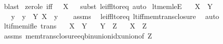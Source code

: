 \begin{isabellebody}
\ blast%
\endisatagproof
{\isafoldproof}%
%
\isadelimproof
\isanewline
%
\endisadelimproof
\isanewline
{}\isamarkupfalse%
\ zero{\isacharunderscore}{\kern0pt}le\ {\isacharbrackleft}{\kern0pt}iff{\isacharbrackright}{\kern0pt}{\isacharcolon}{\kern0pt}\ {\isachardoublequoteopen}{}\ {\isasymle}\ X{\isachardoublequoteclose}%
\isadelimproof
\ %
\endisadelimproof
%
\isatagproof
{}\isamarkupfalse%
\ {\isacharparenleft}{\kern0pt}subst\ le{\isacharunderscore}{\kern0pt}iff{\isacharunderscore}{\kern0pt}lt{\isacharunderscore}{\kern0pt}or{\isacharunderscore}{\kern0pt}eq{\isacharparenright}{\kern0pt}\ auto%
\endisatagproof
{\isafoldproof}%
%
\isadelimproof
%
\endisadelimproof
\isanewline
\isanewline
{}\isamarkupfalse%
\ lt{\isacharunderscore}{\kern0pt}mem{\isacharunderscore}{\kern0pt}leE{\isacharcolon}{\kern0pt}\isanewline
\ \ \ {\isachardoublequoteopen}X\ {\isacharless}{\kern0pt}\ Y{\isachardoublequoteclose}\isanewline
\ \ \ y\ \ {\isachardoublequoteopen}y\ {\isasymin}\ Y{\isachardoublequoteclose}\ {\isachardoublequoteopen}X\ {\isasymle}\ y{\isachardoublequoteclose}\isanewline
%
\isadelimproof
\ \ %
\endisadelimproof
%
\isatagproof
{}\isamarkupfalse%
\ assms\ \isamarkupfalse%
\ le{\isacharunderscore}{\kern0pt}iff{\isacharunderscore}{\kern0pt}lt{\isacharunderscore}{\kern0pt}or{\isacharunderscore}{\kern0pt}eq\ lt{\isacharunderscore}{\kern0pt}iff{\isacharunderscore}{\kern0pt}mem{\isacharunderscore}{\kern0pt}trans{\isacharunderscore}{\kern0pt}closure\ \isamarkupfalse%
\ auto%
\endisatagproof
{\isafoldproof}%
%
\isadelimproof
\isanewline
%
\endisadelimproof
\isanewline
{}\isamarkupfalse%
\ lt{\isacharunderscore}{\kern0pt}if{\isacharunderscore}{\kern0pt}mem{\isacharunderscore}{\kern0pt}if{\isacharunderscore}{\kern0pt}le\ {\isacharbrackleft}{\kern0pt}trans{\isacharbrackright}{\kern0pt}{\isacharcolon}{\kern0pt}\isanewline
\ \ \ {\isachardoublequoteopen}X\ {\isasymle}\ Y{\isachardoublequoteclose}\isanewline
\ \ \ {\isachardoublequoteopen}Y\ {\isasymin}\ Z{\isachardoublequoteclose}\isanewline
\ \ \ {\isachardoublequoteopen}X\ {\isacharless}{\kern0pt}\ Z{\isachardoublequoteclose}\isanewline
%
\isadelimproof
\ \ %
\endisadelimproof
%
\isatagproof
{}\isamarkupfalse%
\ assms\ mem{\isacharunderscore}{\kern0pt}trans{\isacharunderscore}{\kern0pt}closure{\isacharunderscore}{\kern0pt}eq{\isacharunderscore}{\kern0pt}bin{\isacharunderscore}{\kern0pt}union{\isacharunderscore}{\kern0pt}idx{\isacharunderscore}{\kern0pt}union{\isacharbrackleft}{\kern0pt}of\ Z{\isacharbrackright}{\kern0pt}\isanewline

\end{isabellebody}
